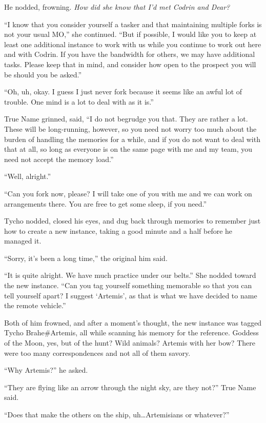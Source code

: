 He nodded, frowning. \emph{How did she know that I'd met Codrin and Dear?}

``I know that you consider yourself a tasker and that maintaining multiple forks is not your usual MO,'' she continued. ``But if possible, I would like you to keep at least one additional instance to work with us while you continue to work out here and with Codrin. If you have the bandwidth for others, we may have additional tasks. Please keep that in mind, and consider how open to the prospect you will be should you be asked.''

``Oh, uh, okay. I guess I just never fork because it seems like an awful lot of trouble. One mind is a lot to deal with as it is.''

True Name grinned, said, ``I do not begrudge you that. They are rather a lot. These will be long-running, however, so you need not worry too much about the burden of handling the memories for a while, and if you do not want to deal with that at all, so long as everyone is on the same page with me and my team, you need not accept the memory load.''

``Well, alright.''

``Can you fork now, please? I will take one of you with me and we can work on arrangements there. You are free to get some sleep, if you need.''

Tycho nodded, closed his eyes, and dug back through memories to remember just how to create a new instance, taking a good minute and a half before he managed it.

``Sorry, it's been a long time,'' the original him said.

``It is quite alright. We have much practice under our belts.'' She nodded toward the new instance. ``Can you tag yourself something memorable so that you can tell yourself apart? I suggest `Artemis', as that is what we have decided to name the remote vehicle.''

Both of him frowned, and after a moment's thought, the new instance was tagged Tycho Brahe\#Artemis, all while scanning his memory for the reference. Goddess of the Moon, yes, but of the hunt? Wild animals? Artemis with her bow? There were too many correspondences and not all of them savory.

``Why Artemis?'' he asked.

``They are flying like an arrow through the night sky, are they not?'' True Name said.

``Does that make the others on the ship, uh\ldots{}Artemisians or whatever?''

